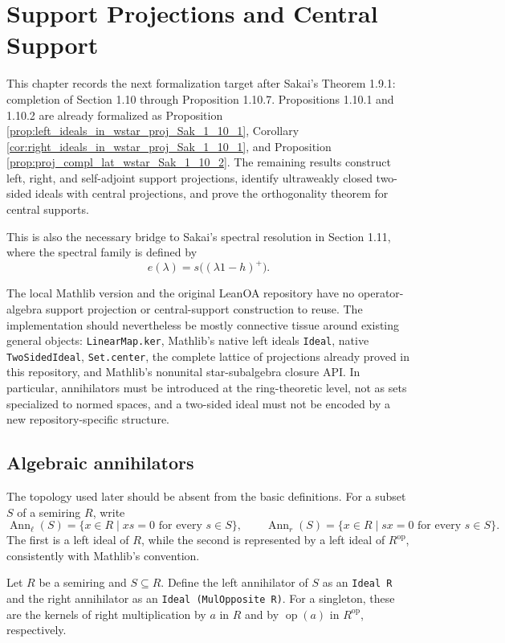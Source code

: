\chapter{Support Projections and Central Support}

This chapter records the next formalization target after Sakai's Theorem 1.9.1: completion of
Section 1.10 through Proposition 1.10.7.  Propositions 1.10.1 and 1.10.2 are already formalized as
Proposition \ref{prop:left_ideals_in_wstar_proj_Sak_1_10_1}, Corollary
\ref{cor:right_ideals_in_wstar_proj_Sak_1_10_1}, and Proposition
\ref{prop:proj_compl_lat_wstar_Sak_1_10_2}.  The remaining results construct left, right, and
self-adjoint support projections, identify ultraweakly closed two-sided ideals with central
projections, and prove the orthogonality theorem for central supports.

This is also the necessary bridge to Sakai's spectral resolution in Section 1.11, where the
spectral family is defined by
\[
  e(\lambda)=s\bigl((\lambda 1-h)^{+}\bigr).
\]

The local Mathlib version and the original LeanOA repository have no operator-algebra support
projection or central-support construction to reuse.  The implementation should nevertheless be
mostly connective tissue around existing general objects:
\texttt{LinearMap.ker}, Mathlib's native left ideals \texttt{Ideal}, native
\texttt{TwoSidedIdeal}, \texttt{Set.center}, the complete lattice of projections already proved in
this repository, and Mathlib's nonunital star-subalgebra closure API.  In particular, annihilators
must be introduced at the ring-theoretic level, not as sets specialized to normed spaces, and a
two-sided ideal must not be encoded by a new repository-specific structure.

\section{Algebraic annihilators}

The topology used later should be absent from the basic definitions.  For a subset $S$ of a
semiring $R$, write
\[
  \operatorname{Ann}_{\ell}(S)=\{x\in R\mid xs=0\text{ for every }s\in S\},\qquad
  \operatorname{Ann}_{r}(S)=\{x\in R\mid sx=0\text{ for every }s\in S\}.
\]
The first is a left ideal of $R$, while the second is represented by a left ideal of
$R^{\mathrm{op}}$, consistently with Mathlib's convention.

\begin{definition}
  \label{def:one_sided_annihilators}
  \notready
  Let $R$ be a semiring and $S\subseteq R$.  Define the left annihilator of $S$ as an
  \texttt{Ideal R} and the right annihilator as an \texttt{Ideal (MulOpposite R)}.  For a singleton,
  these are the kernels of right multiplication by $a$ in $R$ and by
  $\operatorname{op}(a)$ in $R^{\mathrm{op}}$, respectively.
\end{definition}

